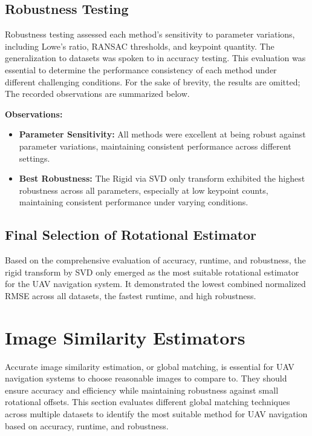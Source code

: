     

\subsection{Robustness Testing}

Robustness testing assessed each method's sensitivity to parameter variations, including Lowe’s ratio, RANSAC thresholds, and keypoint quantity. The generalization to datasets was spoken to in accuracy testing. This evaluation was essential to determine the performance consistency of each method under different challenging conditions. For the sake of brevity, the results are omitted; The recorded observations are summarized below.


\textbf{Observations:}  
\begin{itemize}
    \item \textbf{Parameter Sensitivity:} All methods were excellent at being robust against parameter variations, maintaining consistent performance across different settings.
    \item \textbf{Best Robustness:} The Rigid via SVD only transform exhibited the highest robustness across all parameters, especially at low keypoint counts, maintaining consistent performance under varying conditions.

\end{itemize}

\subsection{Final Selection of Rotational Estimator}

Based on the comprehensive evaluation of accuracy, runtime, and robustness, the rigid transform by SVD only emerged as the most suitable rotational estimator for the UAV navigation system. It demonstrated the lowest combined normalized RMSE across all datasets, the fastest runtime, and high robustness. 

\section{Image Similarity Estimators}

Accurate image similarity estimation, or global matching, is essential for UAV navigation systems to choose reasonable images to compare to. They should ensure accuracy and efficiency while maintaining robustness against small rotational offsets. This section evaluates different global matching techniques across multiple datasets to identify the most suitable method for UAV navigation based on accuracy, runtime, and robustness.


